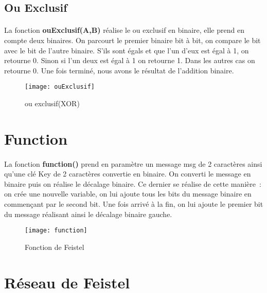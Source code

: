 \documentclass[11pt,fleqn]{book} %
\begin{document}

\subsection{Ou Exclusif}

\paragraph{}La fonction \textbf{ouExclusif(A,B)} réalise le ou exclusif en binaire, elle prend en compte deux binaires.
\vspace{0.5cm}On parcourt le premier binaire bit à bit, on compare le bit avec le bit de l'autre binaire. S'ils sont égals et que l'un d'eux est égal à 1, on retourne 0. Sinon si l'un deux est égal à 1 on retourne 1. Dans les autres cas on retourne 0. Une fois terminé, nous avons le résultat de l'addition binaire.

\begin{figure}[h]
\centering\texttt{[image: ouExclusif]}
\caption{ou exclusif(XOR)}
\end{figure}


\section{Function}

\paragraph{}La fonction \textbf{function()} prend en paramètre un message msg de 2 caractères ainsi qu'une clé Key de 2 caractères convertie en binaire. On converti le message en binaire puis on réalise le décalage binaire. Ce dernier se réalise de cette manière : on crée une nouvelle variable, on lui ajoute tous les bits du message binaire en commençant par le second bit. Une fois arrivé à la fin, on lui ajoute le premier bit du message réalisant ainsi le décalage binaire gauche.

\begin{figure}[h]
\centering\texttt{[image: function]}
\caption{Fonction de Feistel}
\end{figure}


\section{Réseau de Feistel}
\end{document}
